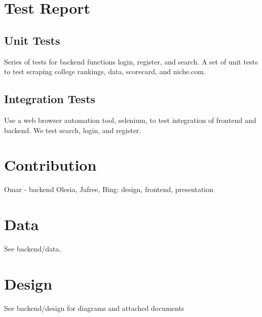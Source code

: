\documentclass{article}
\begin{document}
\section{Test Report}
\subsection{Unit Tests}
Series of tests for backend functions login, register, and search.
A set of unit tests to test scraping college rankings, data, scorecard, and
niche.com. 

\subsection{Integration Tests}
Use a web browser automation tool, selenium, to test integration of frontend and
backend. We test search, login, and register.

\section{Contribution}
Omar - backend 
Olesia, Jafree, Bing: design, frontend, presentation

\section{Data}
See backend/data.

\section{Design}
See backend/design for diagrams and attached documents
\end{document}
